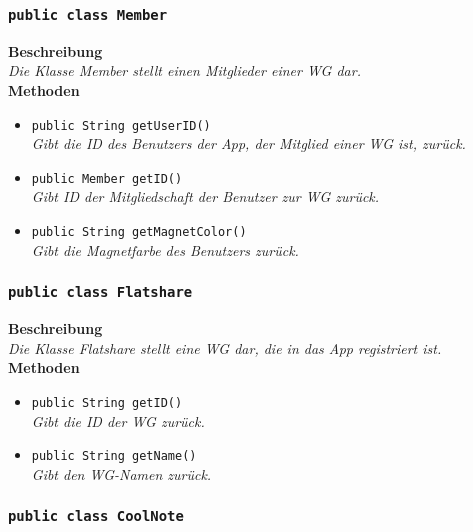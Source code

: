 	

\subsubsection{\texttt{public class Member}}

	\textbf{Beschreibung} \\
	\textit{Die Klasse Member stellt einen Mitglieder einer WG dar.} \\

	\textbf{Methoden}
	\begin{itemize}
		\item\texttt{{public String getUserID()}}\\
		\textit{Gibt die ID des Benutzers der App, der Mitglied einer WG ist, zurück.}\\
		\item\texttt{{public Member getID()}}\\
		\textit{Gibt ID der Mitgliedschaft der Benutzer zur WG zurück.}\\
		\item\texttt{{public String getMagnetColor()}}\\
		\textit{Gibt die Magnetfarbe des Benutzers zurück.}\\
	\end{itemize}       

\subsubsection{\texttt{public class Flatshare}}

	\textbf{Beschreibung} \\
	\textit{Die Klasse Flatshare stellt eine WG dar, die in das App registriert ist.} \\

	\textbf{Methoden}
	\begin{itemize}
		\item\texttt{{public String getID()}}\\
		\textit{Gibt die ID der WG zurück.}\\
		\item\texttt{{public String getName()}}\\
		\textit{Gibt den WG-Namen zurück.}\\
	\end{itemize}

\subsubsection{\texttt{public class CoolNote}}

